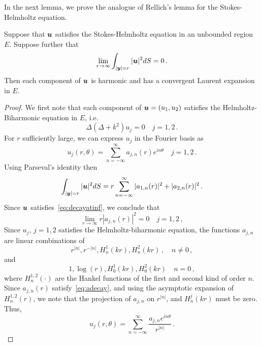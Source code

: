 In the next lemma, we prove the analogue of Rellich's lemma for the Stokes-
Helmholtz equation. 
\begin{lem}
\label{lem:rellich}
Suppose that ${\boldsymbol u}$ satisfies the Stokes-Helmholtz equation in an unbounded
region $E$.  
Suppose further that 
\begin{equation}
\lim_{r \to \infty} \int_{|{\boldsymbol y}|=r} |{\boldsymbol u}|^2 dS = 0 
\, . \label{eq:decayatinf}
\end{equation}
Then each component of ${\boldsymbol u}$ is harmonic and has a convergent Laurent
expansion in $E$.
\end{lem}
\begin{proof}
We first note that each component of ${\boldsymbol u}= (u_{1},u_{2})$ satisfies the 
Helmholtz-Biharmonic equation in $E$, i.e.
\begin{equation}
\Delta (\Delta + k^2) u_{j} = 0 \quad j=1,2 \,. 
\end{equation}
For $r$ sufficiently large, we can express $u_{j}$ in the Fourier basis as
\begin{equation}
u_{j}(r,\theta) = \sum_{n=-\infty}^{\infty} a_{j,n}(r) e^{i n \theta}  \quad 
j=1,2 \, .
\end{equation}
Using Parseval's identity then
\begin{equation}
\int_{|{\boldsymbol y}|=r} |{\boldsymbol u}|^2 dS = r\sum_{n=-\infty}^{\infty} |a_{1,n}(r)|^2  +
|a_{2,n}(r)|^2 \, .
\end{equation}
Since ${\boldsymbol u}$ satisfies~\cref{eq:decayatinf}, we conclude that
\begin{equation}
\lim_{r\to\infty} r|a_{j,n}(r)|^2 = 0 \quad j=1,2 \, , \label{eq:adecay}
\end{equation}
Since $u_{j}$, $j=1,2$ satisfies the Helmholtz-biharmonic equation,
the functions $a_{j,n}$ are linear combinations of 
\begin{equation}
r^{|n|}, r^{-|n|}, H^{1}_{n}(k r), H^{2}_{n}(k r) \, , \quad
n\neq 0 \, ,
\end{equation}
and
\begin{equation}
1, \log{(r)}, H^{1}_{0}(k r), H^{2}_{0}(k r) \quad n=0 \, , 
\end{equation} 
where $H_{n}^{1,2}(\cdot)$ are the Hankel functions of the first and
second kind of order $n$.
Since $a_{j,n}(r)$ satisfy~\cref{eq:adecay}, and using the asymptotic 
expansion of $H_{n}^{1,2}(r)$, we note that the projection of 
$a_{j,n}$ on $r^{|n|}$, and $H_{n}^{j}(k r)$ must be zero. 
Thus, 
\begin{equation}
u_{j}(r,\theta) = \sum_{n=-\infty}^{\infty} \frac{a_{j,n} e^{i n \theta}}{r^{|n|}} 
\, .
\end{equation}
\end{proof}

